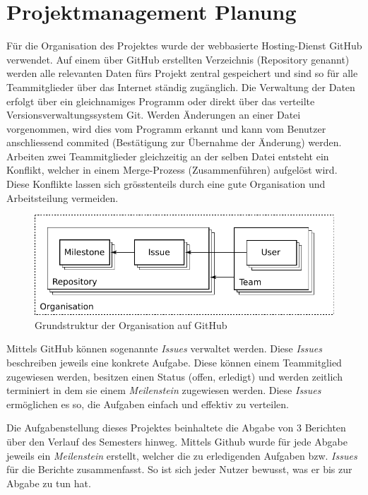 \section{Projektmanagement Planung}
Für die Organisation des Projektes wurde der webbasierte Hosting-Dienst
GitHub verwendet. Auf einem über GitHub erstellten Verzeichnis (Repository
genannt) werden alle relevanten Daten fürs Projekt zentral gespeichert und
sind so für alle Teammitglieder über das Internet ständig zugänglich. Die
Verwaltung der Daten erfolgt über ein gleichnamiges Programm oder direkt
über das verteilte Versionsverwaltungssystem Git. Werden Änderungen an
einer Datei vorgenommen, wird dies vom Programm erkannt und kann vom
Benutzer anschliessend commited (Bestätigung zur Übernahme der Änderung)
werden. Arbeiten zwei Teammitglieder gleichzeitig an der selben Datei
entsteht ein Konflikt, welcher in einem Merge-Prozess (Zusammenführen)
aufgelöst wird. Diese Konflikte lassen sich grösstenteils durch eine gute
Organisation und Arbeitsteilung vermeiden.

\begin{figure}[h!]
	\centering
	\includegraphics[scale=1]{../../fig/pm/repository.pdf}
	\caption{Grundstruktur der Organisation auf GitHub}
	\label{fig:gh-org}
\end{figure}

Mittels GitHub können sogenannte \emph{Issues} verwaltet werden. Diese
\emph{Issues} beschreiben jeweils eine konkrete Aufgabe. Diese können
einem Teammitglied zugewiesen werden, besitzen einen Status (offen,
erledigt) und werden zeitlich terminiert in dem sie einem
\emph{Meilenstein} zugewiesen werden. Diese \emph{Issues} ermöglichen
es so, die Aufgaben einfach und effektiv zu verteilen.

Die Aufgabenstellung dieses Projektes beinhaltete die Abgabe von 3
Berichten über den Verlauf des Semesters hinweg. Mittels Github wurde
für jede Abgabe jeweils ein \emph{Meilenstein} erstellt, welcher die
zu erledigenden Aufgaben bzw. \emph{Issues} für die Berichte
zusammenfasst. So ist sich jeder Nutzer bewusst, was er bis zur
Abgabe zu tun hat.

